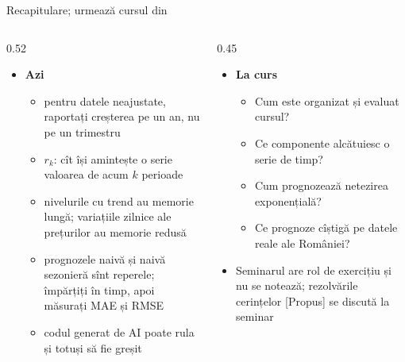\begin{frame}{Recapitulare; urmează cursul din }
\itemsize{\footnotesize}
\begin{columns}[T]
\begin{column}{0.52\textwidth}
\begin{itemize}
    \item \textbf{Azi}
    \begin{itemize}
        \item pentru datele neajustate, raportați creșterea pe un an, nu pe un trimestru
        \item $r_k$: cît își amintește o serie valoarea de acum $k$ perioade
        \item nivelurile cu trend au memorie lungă; variațiile zilnice ale prețurilor au memorie redusă
        \item prognozele naivă și naivă sezonieră sînt reperele; împărțiți în timp, apoi măsurați MAE și RMSE
        \item codul generat de AI poate rula și totuși să fie greșit
    \end{itemize}
\end{itemize}
\end{column}
\begin{column}{0.45\textwidth}
\begin{itemize}
    \item \textbf{La curs}
    \begin{itemize}
        \item Cum este organizat și evaluat cursul?
        \item Ce componente alcătuiesc o serie de timp?
        \item Cum prognozează netezirea exponențială?
        \item Ce prognoze cîștigă pe datele reale ale României?
    \end{itemize}
    \item Seminarul are rol de exercițiu și nu se notează; rezolvările cerințelor [Propus] se discută la seminar
\end{itemize}
\end{column}
\end{columns}
\end{frame}


